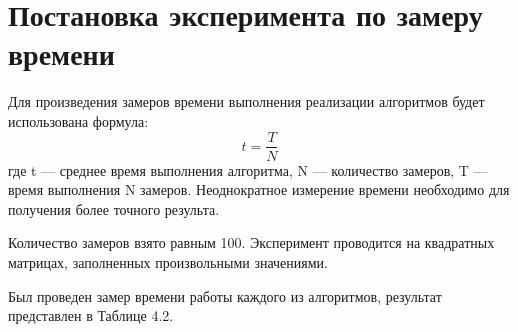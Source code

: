\documentclass[12pt]{report}
\begin{document}
\newpage
\section{Постановка эксперимента по замеру времени}

Для произведения замеров времени выполнения реализации алгоритмов будет использована формула: \begin{equation}\label{eq:fourierrow}
	t = \frac{T}{N}
\end{equation}
где t — среднее время выполнения алгоритма, N — количество замеров, T — время выполнения N замеров.  
Неоднократное измерение времени необходимо для получения более точного результа.  
 
 Количество замеров взято равным 100. Эксперимент проводится на квадратных матрицах, заполненных произвольными значениями.
 
 Был проведен замер времени работы каждого из алгоритмов, результат представлен в Таблице 4.2. \vspace{\baselineskip}
 
\end{document}

